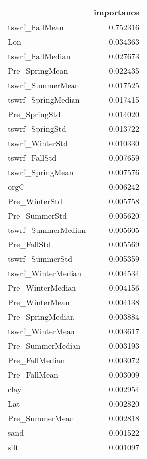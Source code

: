 \begin{tabular}{lr}
\toprule
 & importance \\
\midrule
tswrf_FallMean & 0.752316 \\
Lon & 0.034363 \\
tswrf_FallMedian & 0.027673 \\
Pre_SpringMean & 0.022435 \\
tswrf_SummerMean & 0.017525 \\
tswrf_SpringMedian & 0.017415 \\
Pre_SpringStd & 0.014020 \\
tswrf_SpringStd & 0.013722 \\
tswrf_WinterStd & 0.010330 \\
tswrf_FallStd & 0.007659 \\
tswrf_SpringMean & 0.007576 \\
orgC & 0.006242 \\
Pre_WinterStd & 0.005758 \\
Pre_SummerStd & 0.005620 \\
tswrf_SummerMedian & 0.005605 \\
Pre_FallStd & 0.005569 \\
tswrf_SummerStd & 0.005359 \\
tswrf_WinterMedian & 0.004534 \\
Pre_WinterMedian & 0.004156 \\
Pre_WinterMean & 0.004138 \\
Pre_SpringMedian & 0.003884 \\
tswrf_WinterMean & 0.003617 \\
Pre_SummerMedian & 0.003193 \\
Pre_FallMedian & 0.003072 \\
Pre_FallMean & 0.003009 \\
clay & 0.002954 \\
Lat & 0.002820 \\
Pre_SummerMean & 0.002818 \\
sand & 0.001522 \\
silt & 0.001097 \\
\bottomrule
\end{tabular}

